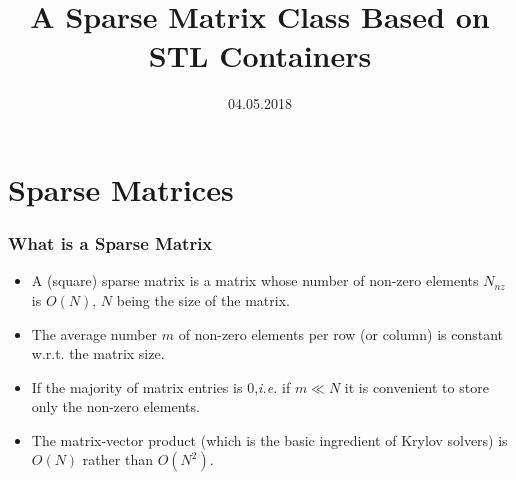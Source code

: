 \documentclass{beamer}
\begin{document}
\title{A Sparse Matrix Class Based on STL Containers}
\date{04.05.2018}

\begin{frame}
\maketitle
\end{frame}

\section{Sparse Matrices}

\begin{frame}
\frametitle{What is a Sparse Matrix}
\begin{itemize}
\item A (square) sparse matrix is a matrix whose number of non-zero elements $N_{nz}$ is $O(N)$, 
$N$ being the size of the matrix. \\[3mm]
\item The average number $m$ of non-zero elements per row (or column)
is constant w.r.t. the matrix size. \\[3mm]
\item If the majority of matrix entries is $0$,{\it i.e.} if $m \ll N$ it is convenient 
to store only the non-zero elements.\\[3mm]
\item The matrix-vector product (which is the basic ingredient of Krylov solvers) is $O(N)$ rather than $O(N^{2})$.\\[3mm]
\end{itemize}
\end{frame}
\end{document}
